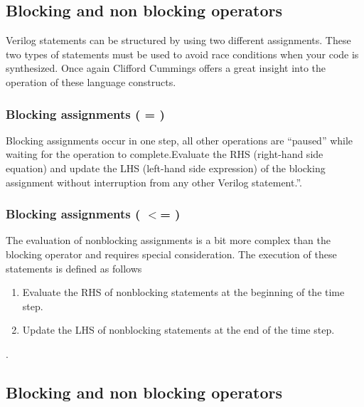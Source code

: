   \subsection{Blocking and non blocking operators}
    Verilog statements can be structured by using two different assignments. These two types of statements must be used to avoid race conditions when your code is synthesized. Once again Clifford Cummings offers a great insight into the operation of these language constructs. 
      
    \subsubsection{Blocking assignments \bfseries ( = )} 
      Blocking assignments occur in one step, all other operations are ``paused'' while waiting for the operation to complete.Evaluate the RHS (right-hand side equation) and update the LHS (left-hand side expression) of the blocking assignment without interruption from any other Verilog statement.''\cite{Sunburst:BlockNoBlock}.

    \subsubsection{Blocking assignments \bfseries ( $<$= )} 
      The evaluation of nonblocking assignments is a bit more complex than the blocking operator and requires special consideration. The execution of these statements is defined as follows
      \begin{enumerate}
        \item Evaluate the RHS of nonblocking statements at the beginning of the time step.
        \item Update the LHS of nonblocking statements at the end of the time step.
      \end{enumerate}
      \cite{Sunburst:BlockNoBlock}.

  \subsection{Blocking and non blocking operators}



